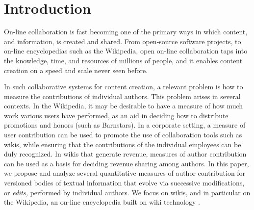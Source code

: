 
\section{Introduction}

On-line collaboration is fast becoming one of the primary ways in
which content, and information, is created and shared. 
From open-source software projects, to on-line encyclopedias such as
the Wikipedia, open on-line collaboration taps into the knowledge,
time, and resources of millions of people, and it enables content
creation on a speed and scale never seen before.

In such collaborative systems for content creation, a relevant 
problem is how to measure the contributions of individual authors. 
This problem arises in several contexts.
In the Wikipedia, it may be desirable to have a measure of how much
work various users have performed, as an aid in deciding how to
distribute promotions and honors (such as Barnstars). 
In a corporate setting, a measure of user contribution can be used to
promote the use of collaboration tools such as wikis, while ensuring
that the contributions of the individual employees can be duly
recognized. 
In wikis that generate revenue, measures of author contribution can be
used as a basis for deciding revenue sharing among authors. 
In this paper, we propose and analyze several quantitative measures of
author contribution for versioned bodies of textual information that
evolve via successive modifications, or {\em edits,} performed by
individual authors. 
We focus on wikis, and in particular on the Wikipedia, an on-line
encyclopedia built on wiki technology \cite{Wikis01}. 

